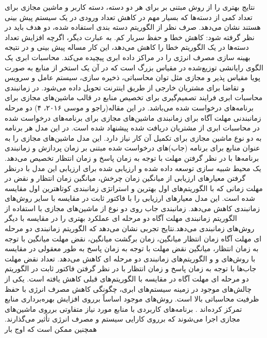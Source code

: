    نتایج بهتری را از روش مبتنی بر
   برای هر دو دسته، دسته کاربر و ماشین مجازی برای تعداد کمی‌ از دسته‌ها که بسیار مهم در کاهش تعداد ورودی در یک سیستم پیش بینی هستند نشان می‌دهد. صرف نظر از الگوریتم دسته بندی استفاده شده، دو هدف باید در نظر گرفته شود: کاهش خطا و حفظ سربار کم. به عبارت دیگر، اگرچه افزایش تعداد دسته‌ها در یک الگوریتم خطا را کاهش می‌دهد، این کار مساله پیش بینی و در نتیجه بهینه سازی مصرف انرژی را در مراکز داده ابری پیچیده می‌کند.
محاسبات ابری یک الگوی رایانشی توزیع‌شده در مقیاس بزرگ است که در آن یک استخر از منابع به صورت پویا مقیاس پذیر و مجازی مثل توان محاسباتی، ذخیره سازی، سیستم عامل و سرویس و تقاضا برای مشتریان خارجی از طریق اینترنت تحویل داده می‌شود. در زمانبندی محاسبات ابری فرایند تصمیم‌گیری برای تخصیص منابع در قالب ماشین‌های مجازی برای برنامه‌های درخواست شده می‌باشد. در این مقاله(راجو و موسی ۲۰۱۶، ۴)
دو مرحله زمانبندنی مهلت آگاه برای زمانبندی ماشین‌های مجازی برای برنامه‌های درخواست شده در محاسبات ابری از مشتریان دریافت شده پیشنهاد شده است. در این مدل هر برنامه به دو نوع ماشین مجازی برای تکمیل آن کار نیاز دارد. این مدل ماشین‌های مجازی را به عنوان منابع برای برنامه (جاب)‌های درخواست شده مبتنی بر زمان پردازش و زمانبندی برنامه‌ها با در نظر گرفتن مهلت با توجه به زمان پاسخ و زمان انتظار تخصیص می‌دهد. یک محیط شبیه سازی توسعه داده شده و ارزیابی شده برای ارزیابی این مدل با درنظر گرفتن معیارهای ارزیابی از میانگین زمان چرخش، میانگین زمان انتظار و نقض در مهلت زمانی که با الگوریتم‌های اول بهترین 
 و استراتژی زمانبندی کوتاهترین اول 
  مقایسه شده است. این مدل معیارهای ارزیابی را با فاکتور ثابت در مقایسه با سایر روش‌های زمانبندی کاهش می‌دهد. زمانبندی 
   جاب روی دو نوع از ماشین‌های مجازی با استفاده از الگوریتم زمانبندی مهلت آگاه دو مرحله ای عملکرد بهتری را در مقایسه با دیگر روش‌های زمانبندی می‌دهد.نتایج تجربی نشان می‌دهد که الگوریتم زمانبندی دو مرحله ای مهلت آگاه زمان انتظار میانگین، زمان برگشت میانگین، نقض مهلت میانگین با توجه به زمان انتظار، میانگین نقض مهلت با توجه به زمان پاسخ به طور معقولی در مقایسه با روش‌های 
   و
    و الگوریتم‌های زمانبندی دو مرحله ای کاهش می‌دهد. تعداد نقض مهلت جاب‌ها با توجه به زمان پاسخ و زمان انتظار با در نظر گرفتن فاکتور ثابت در الگوریتم دو مرحله ای مهلت آگاه در مقایسه با الگوریتم‌های قبلی کاهش یافته است.
 یکی از چالش‌های موجود در زمینه سیستم‌های ابری، چگونگی کاهش مصرف انرژی با حفظ ظرفیت محاسباتی بالا است. روش‌های موجود اساساً برروی افزایش بهره‌برداری منابع تمرکز کرده‌اند . برنامه‌های کاربردی با منابع مورد نیاز متفاوتی برروی ماشین‌های مجازی اجرا می‌شوند که برروی کارایی سیستم و مصرف انرژی تأثیر می‌گذارند. همچنین ممکن است که اوج بار
